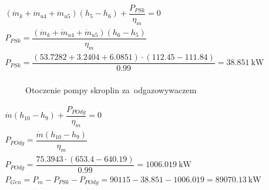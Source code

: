 \begin{math}
	\begin{array}{l}
		(\dot m_k + \dot m_{u4} + \dot m_{u5})(h_5 - h_6)
			+ \dfrac{P_{PSk}}{\eta_m} = 0 \\
		P_{PSk} = \dfrac{(\dot m_k + \dot m_{u4} + \dot m_{u5})(h_6 - h_5)
			}{\eta_m} \\
		P_{PSk} = \dfrac{(\num{53,7282} + \num{3,2404} + \num{6,0851})
				\cdot (\num{112,45} - \num{111,84})
			}{\num{0,99}}
			= \SI{38,851}{\kilo\watt} \\
	\end{array}
\end{math}

\begin{figure}[H]
	\centering

	\caption{Otoczenie pompy skroplin za~odgazowywaczem}
\end{figure}

\begin{math}
	\begin{array}{l}
		\dot m (h_{10} - h_9) + \dfrac{P_{POdg}}{\eta_m} = 0 \\
		P_{POdg} = \dfrac{\dot m (h_{10} - h_9)}{\eta_m} \\
		P_{POdg} = \dfrac{\num{75,3943} \cdot (\num{653,4} - \num{640,19})
			}{\num{0,99}}
			= \SI{1006,019}{\kilo\watt} \\
		P_{Gen} = P_m - P_{PSk} - P_{POdg}
			= \num{90115} - \num{38,851} - \num{1006,019}
			= \SI{89070,13}{\kilo\watt} \\
	\end{array}
\end{math}

